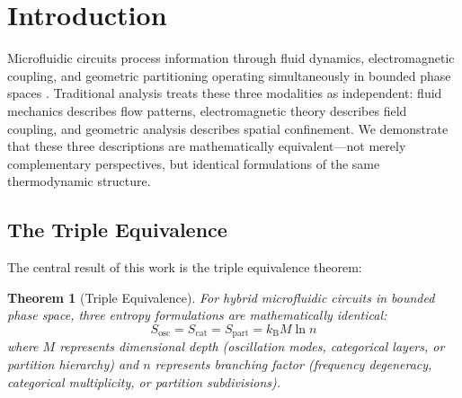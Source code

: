 \documentclass[12pt,a4paper]{article}
\theoremstyle{plain}
\newtheorem{theorem}{Theorem}[section]
\theoremstyle{definition}
\theoremstyle{remark}
\newcommand{\kB}{k_{\mathrm{B}}}
\newcommand{\Sosc}{S_{\mathrm{osc}}}
\newcommand{\Scat}{S_{\mathrm{cat}}}
\newcommand{\Spart}{S_{\mathrm{part}}}
\begin{document}
\begin{abstract}
The framework establishes hybrid microfluidic circuits as implementing thermodynamic computation through continuous free energy minimization over coherent oscillatory landscapes, with computational universality achieved through controllability, memory persistence, conditional operations via phase threshold dynamics, and hierarchical composability. Applications include circuit design optimization, fault diagnosis through depth measurement, and programmable state transformations via aperture modulation.

\textbf{Keywords:} hybrid microfluidic circuits, partition coordinates, S-entropy space, triple equivalence, categorical necessity, No Null State Principle, meaninglessness, gyrometric dynamics, rotational quantum numbers, state privacy, geometric molecular apertures, phase-lock networks, Poincaré computing, trajectory completion, categorical thermometry, quintupartite virtual microscopy
\end{abstract}

\tableofcontents
\newpage

\section{Introduction}
\label{sec:introduction}

Microfluidic circuits process information through fluid dynamics, electromagnetic coupling, and geometric partitioning operating simultaneously in bounded phase spaces \cite{Whitesides2006,Stone2004}. Traditional analysis treats these three modalities as independent: fluid mechanics describes flow patterns, electromagnetic theory describes field coupling, and geometric analysis describes spatial confinement. We demonstrate that these three descriptions are mathematically equivalent—not merely complementary perspectives, but identical formulations of the same thermodynamic structure.

\subsection{The Triple Equivalence}

The central result of this work is the triple equivalence theorem:

\begin{theorem}[Triple Equivalence]
\label{thm:triple_equivalence}
For hybrid microfluidic circuits in bounded phase space, three entropy formulations are mathematically identical:
\begin{equation}
\Sosc = \Scat = \Spart = \kB M \ln n
\label{eq:triple_equivalence}
\end{equation}
where $M$ represents dimensional depth (oscillation modes, categorical layers, or partition hierarchy) and $n$ represents branching factor (frequency degeneracy, categorical multiplicity, or partition subdivisions).
\end{theorem}
\end{document}
